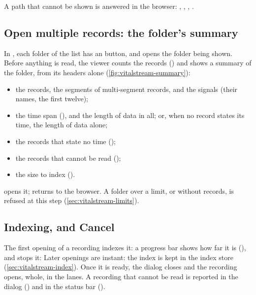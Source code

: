 A path that cannot be shown is answered in the browser: , , , .

\subsection{Open multiple records: the folder's summary}
\label{sec:vitalstream-summary}

In , each folder of the list has an  button, and
 opens the folder being shown. Before anything is read, the
viewer counts the records () and shows a summary of the folder,
from its headers alone (\cref{fig:vitalstream-summary}):
\begin{itemize}
\item the records, the segments of multi-segment records, and the signals (their names, the first
  twelve);
\item the time span (), and the length of data in all; or, when no record
  states its time, the length of data alone;
\item the records that state no time ();
\item the records that cannot be read ();
\item the size to index ().
\end{itemize}
 opens it;  returns to the browser. A folder over a limit, or
without records, is refused at this step (\cref{sec:vitalstream-limits}).


\subsection{Indexing, and Cancel}
\label{sec:vitalstream-indexing}

The first opening of a recording indexes it: a progress bar shows how far it is (), and
 stops it:  Later openings are instant: the index
is kept in the index store (\cref{sec:vitalstream-index}). Once it is ready, the dialog closes
and the recording opens, whole, in the lanes. A recording that cannot be read is reported in the
dialog () and in the status bar ().

